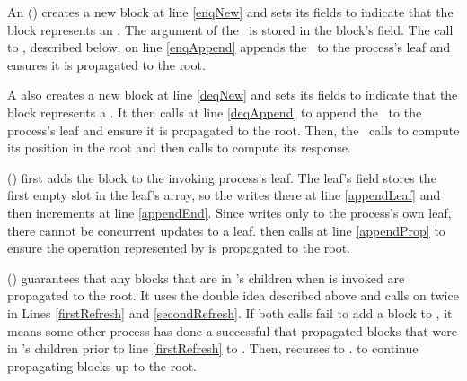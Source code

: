 An () 
creates a new block at line \ref{enqNew} and sets its  fields to indicate
that the block represents an .  The argument  of the \enqueue\ is stored in the block's 
field.
The call to , described below, on line \ref{enqAppend}
appends the \block\ to the process's leaf and ensures it is propagated to the root.

A  also 
creates a new block at line \ref{deqNew} and sets its  fields to indicate
that the block represents a \dequeue.
It then calls  at line \ref{deqAppend} to append the \block\ to the process's leaf and ensure
it is propagated to the root.
Then, the \dequeue\ calls  to compute
its position in the root 
 and then calls  to compute its response.

() first adds the block  to the invoking process's leaf.
The leaf's  field stores the first empty slot in the leaf's  array,
so the  writes  there at line \ref{appendLeaf} and then increments  at line \ref{appendEnd}.
Since  writes only to the process's own leaf, there cannot be concurrent updates to a leaf.
 then calls  at line \ref{appendProp} to ensure the operation represented by  is propagated to the root.

() guarantees that any blocks that are in 's children when  is invoked are propagated to the root.
It uses the double  idea described
above and calls   on  twice in Lines
\ref{firstRefresh} and \ref{secondRefresh}. 
If both calls fail to add a block to , it means some other process has done a successful 
that propagated blocks that were in 's children prior to line \ref{firstRefresh} to .
Then,  recurses to . to continue propagating blocks up to the root.  

